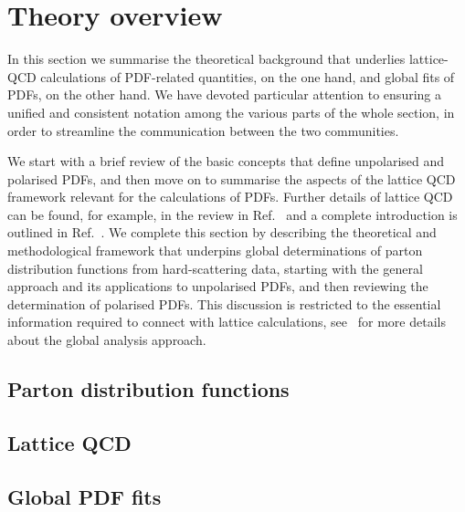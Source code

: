
\section{Theory overview}
\label{sec:theoryoverview}

In this section we summarise the theoretical background that underlies
lattice-QCD calculations of PDF-related quantities, on the one hand, and 
global fits of PDFs, on the other hand.
%
We have devoted particular attention to ensuring a unified and
consistent notation among the various parts of the whole section,
in order to streamline the communication between the two communities.

We start with a brief review
of the basic concepts that define
unpolarised and polarised PDFs, and then
move on to
summarise the aspects of the lattice QCD framework
relevant for the calculations of PDFs. 
%
Further details of lattice QCD can be found, for example, in the
review in Ref.~\cite{Olive:2016xmw} and a complete
introduction is outlined in Ref.~\cite{Gupta:1997nd}. 
%
We complete this section by describing the theoretical and methodological framework that 
underpins global determinations of parton distribution functions from 
hard-scattering data, starting with the general approach and its applications 
to unpolarised PDFs, and then reviewing the determination of 
polarised PDFs.
%
This discussion is restricted to the
essential information required to connect
with lattice calculations,
see~\cite{Ball:2012wy,Forte:2013wc,Rojo:2015acz,Butterworth:2015oua} for
more details about the global analysis approach.

\subsection{Parton distribution functions}
\label{Sec:IntroLQCD}



\subsection{Lattice QCD}
\label{Sec:IntroLQCD}



\subsection{Global PDF fits}





